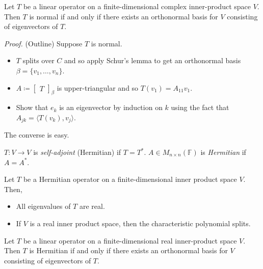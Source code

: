 \documentclass[12pt]{article}
\newenvironment{lemma}[2][Lemma]{\begin{trivlist}
\item[\hskip \labelsep {\bfseries #1}\hskip \labelsep {\bfseries #2.}]}{\end{trivlist}}
\newenvironment{theorem}[2][Theorem]{\begin{trivlist}
\item[\hskip \labelsep {\bfseries #1}\hskip \labelsep {\bfseries #2.}]}{\end{trivlist}}
\newenvironment{definition}[2][Definition]{\begin{trivlist}
\item[\hskip \labelsep {\bfseries #1}\hskip \labelsep {\bfseries #2}]}{\end{trivlist}}
\begin{document}
\begin{theorem}{6.16}
Let $T$ be a linear operator on a finite-dimensional complex inner-product space $V$. Then $T$ is normal if and only if there exists an orthonormal basis for $V$ consisting of eigenvectors of $T$.
\end{theorem}

\textit{Proof.} (Outline) Suppose $T$ is normal.

\begin{itemize}
    \item $T$ splits over $C$ and so apply Schur's lemma to get an orthonormal basis $\beta = \{v_1, \dots, v_n\}$.
    
    \item $A \coloneqq \begin{bmatrix} T \end{bmatrix}_\beta$ is upper-triangular and so $T(v_1) = A_{11}v_1$.
    
    \item Show that $e_k$ is an eigenvector by induction on $k$ using the fact that $A_{jk} = \langle T(v_k), v_j \rangle$.
\end{itemize}

The converse is easy.

\begin{definition}{8}
$T : V \to V$ is \textit{self-adjoint} (Hermitian) if $T = T^*$. $A \in M_{n \times n}(\mathbb{F})$ is \textit{Hermitian} if $A = A^*$. 
\end{definition}

\begin{lemma}{19}
Let $T$ be a Hermitian operator on a finite-dimensional inner product space $V$. Then,

\begin{itemize}
    \item[(a)] All eigenvalues of $T$ are real.
    
    \item[(b)] If $V$ is a real inner product space, then the characteristic polynomial splits.
\end{itemize}
\end{lemma}

\begin{theorem}{6.17}
Let $T$ be a linear operator on a finite-dimensional real inner-product space $V$. Then $T$ is Hermitian if and only if there exists an orthonormal basis for $V$ consisting of eigenvectors of $T$.
\end{theorem}
\end{document}
